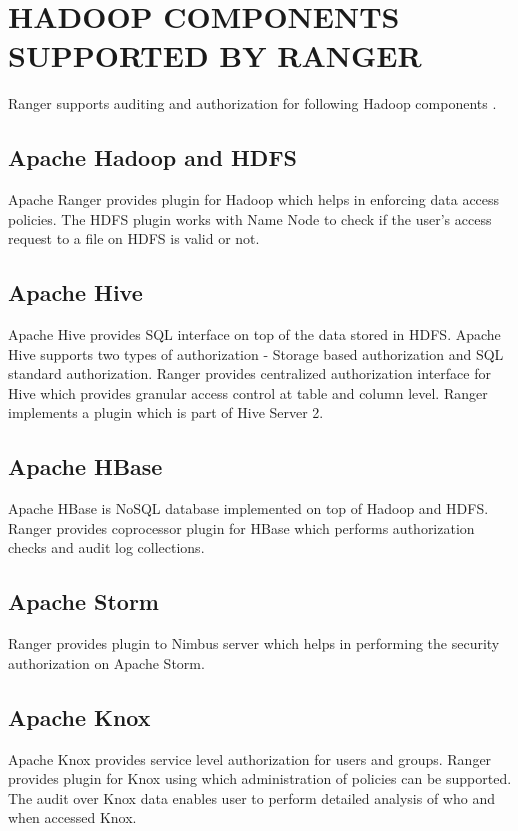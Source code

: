 \documentclass[9pt,twocolumn,twoside]{styles/osajnl}
\begin{document}
\section{HADOOP COMPONENTS SUPPORTED BY RANGER}

Ranger supports auditing and authorization for following Hadoop components
\cite{www-ranger-faq}.

\subsection{Apache Hadoop and HDFS}

Apache Ranger provides plugin for Hadoop which helps in enforcing data access
policies. The HDFS plugin works with Name Node to check if the user's access
request to a file on HDFS is valid or not.

\subsection{Apache Hive}

Apache Hive provides SQL interface on top of the data stored in HDFS. Apache
Hive supports two types of authorization - Storage based authorization and
SQL standard authorization. Ranger provides centralized authorization
interface for Hive which provides granular access control at table and column
 level. Ranger implements a plugin which is part of Hive Server 2.

\subsection{Apache HBase}
Apache HBase is NoSQL database implemented on top of Hadoop and HDFS. Ranger
provides coprocessor plugin for HBase which performs authorization checks and
 audit log collections.

\subsection{Apache Storm}
Ranger provides plugin to Nimbus server which helps in performing the
security authorization on Apache Storm.

\subsection{Apache Knox}
Apache Knox provides service level authorization for users and groups. Ranger
 provides plugin for Knox using which administration of policies can be
 supported. The audit over Knox data enables user to perform detailed
 analysis of who and when accessed Knox.
\end{document}
